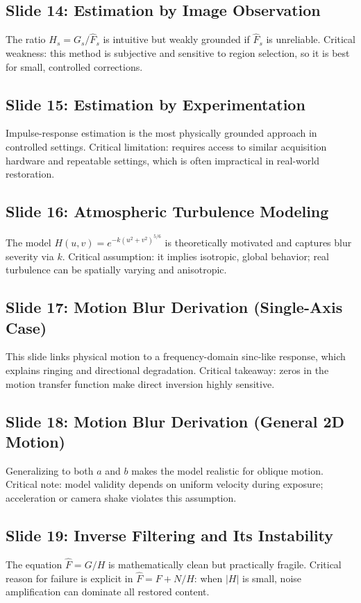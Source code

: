 \documentclass[12pt,a4paper]{article}
\begin{document}
\subsection{Slide 14: Estimation by Image Observation}
The ratio $H_s=G_s/\hat{F}_s$ is intuitive but weakly grounded if $\hat{F}_s$ is unreliable. Critical weakness: this method is subjective and sensitive to region selection, so it is best for small, controlled corrections.

\subsection{Slide 15: Estimation by Experimentation}
Impulse-response estimation is the most physically grounded approach in controlled settings. Critical limitation: requires access to similar acquisition hardware and repeatable settings, which is often impractical in real-world restoration.

\subsection{Slide 16: Atmospheric Turbulence Modeling}
The model $H(u,v)=e^{-k(u^2+v^2)^{5/6}}$ is theoretically motivated and captures blur severity via $k$. Critical assumption: it implies isotropic, global behavior; real turbulence can be spatially varying and anisotropic.

\subsection{Slide 17: Motion Blur Derivation (Single-Axis Case)}
This slide links physical motion to a frequency-domain sinc-like response, which explains ringing and directional degradation. Critical takeaway: zeros in the motion transfer function make direct inversion highly sensitive.

\subsection{Slide 18: Motion Blur Derivation (General 2D Motion)}
Generalizing to both $a$ and $b$ makes the model realistic for oblique motion. Critical note: model validity depends on uniform velocity during exposure; acceleration or camera shake violates this assumption.

\subsection{Slide 19: Inverse Filtering and Its Instability}
The equation $\hat{F}=G/H$ is mathematically clean but practically fragile. Critical reason for failure is explicit in $\hat{F}=F+N/H$: when $|H|$ is small, noise amplification can dominate all restored content.
\end{document}
